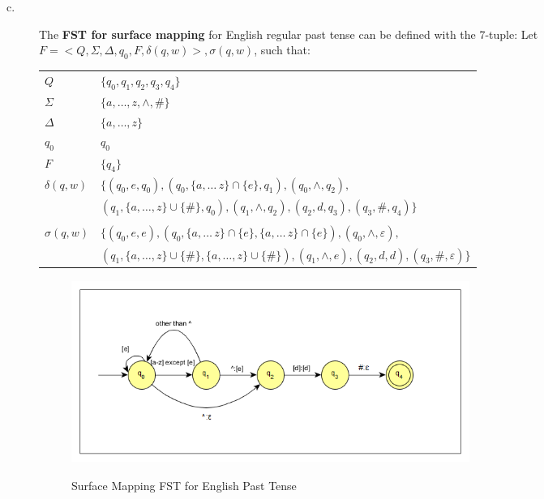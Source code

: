\documentclass[11pt]{article}
\begin{document}
\begin{solution}
\begin{description}
	\item[c.] The \textbf{FST for surface mapping} for English regular past tense can be defined with the 7-tuple:
	Let $F = <Q, \Sigma, \Delta, q_{0}, F, \delta(q, w)>, \sigma(q, w)$, such that:

	\begin{tabular}{l | l}
		$Q$ & $\{ q_{0}, q_{1}, q_{2}, q_{3}, q_{4}\}$ \\
		$\Sigma$ & $\{a, \ldots, z, \wedge, \# \}$ \\
		$\Delta$ & $\{a, \ldots, z\}$ \\
		$q_{0}$ & $q_{0}$ \\
		$F$ & $\{ q_{4} \}$ \\
		$\delta(q, w)$ &  $\{(q_{0},e,q_{0}), (q_{0}, \{a, \ldots\, z\} \cap \{e\}, q_{1}), (q_{0},\wedge, q_{2}), $ \\
		 &  $(q_{1},\{a, \ldots, z\} \cup \{\#\},q_{0}), (q_{1}, \wedge , q_{2}), (q_{2}, d, q_{3}), (q_{3}, \#, q_{4})\}$\\
		 & \\
		$\sigma(q, w)$ & $\{(q_{0},e,e), (q_{0}, \{a, \ldots\, z\} \cap \{e\},\{a, \ldots\, z\} \cap \{e\}), (q_{0},\wedge, \varepsilon), $ \\
		 &  $(q_{1},\{a, \ldots, z\} \cup \{\#\},\{a, \ldots, z\} \cup \{\#\}), (q_{1}, \wedge , e), (q_{2}, d, d), (q_{3}, \#, \varepsilon)\}$\\
	\end{tabular}

	\begin{figure}[h]
		\centering
		\includegraphics[width=13cm, height=6cm]{problem07partc} \\
		\caption{Surface Mapping FST for English Past Tense}
	\end{figure}

\end{description}

\end{solution}
\end{document}
